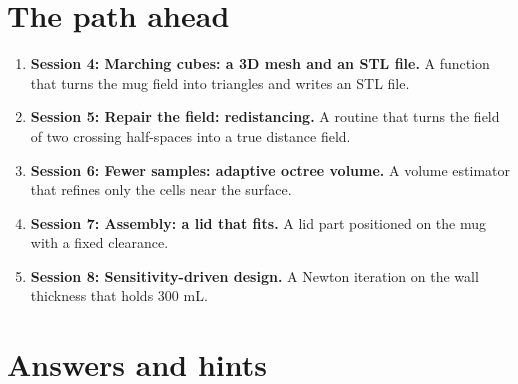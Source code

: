 \documentclass[11pt,a4paper]{article}
\begin{document}
\section{The path ahead}
\begin{enumerate}[nosep]
\item \textbf{Session 4: Marching cubes: a 3D mesh and an STL file.} A function that turns the mug field into triangles and writes an STL file.
\item \textbf{Session 5: Repair the field: redistancing.} A routine that turns the field of two crossing half-spaces into a true distance field.
\item \textbf{Session 6: Fewer samples: adaptive octree volume.} A volume estimator that refines only the cells near the surface.
\item \textbf{Session 7: Assembly: a lid that fits.} A lid part positioned on the mug with a fixed clearance.
\item \textbf{Session 8: Sensitivity-driven design.} A Newton iteration on the wall thickness that holds 300 mL.
\end{enumerate}

\section{Answers and hints}
\end{document}
